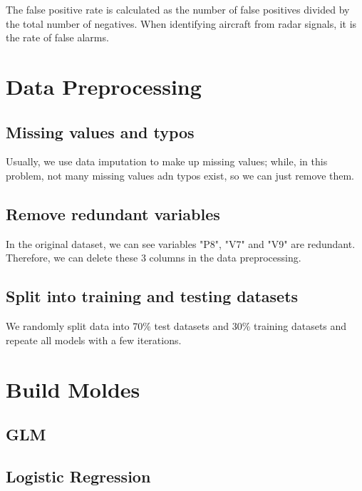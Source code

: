 \documentclass[11pt]{article}
\begin{document}
\begin{singlespacing}
The false positive rate is calculated as the number of false positives divided by the total number of negatives. When identifying aircraft from radar signals, it is the rate of false alarms.


\section{Data Preprocessing}
\subsection{Missing values and typos}
Usually, we use data imputation to make up missing values; while, in this problem, not many missing values adn typos exist, so we can just remove them. 

\subsection{Remove redundant variables}
In the original dataset, we can see variables "P8", "V7" and "V9" are redundant. Therefore, we can delete these 3 columns in the data preprocessing.

\subsection{Split into training and testing datasets}
We randomly split data into 70\% test datasets and 30\% training datasets and repeate all models with a few iterations.


\section{Build Moldes}
\subsection{GLM}

\subsection{Logistic Regression}


\end{singlespacing}
\end{document}
